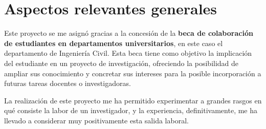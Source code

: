\section{Aspectos relevantes generales}

Este proyecto se me asignó gracias a la concesión de la \textbf{beca de colaboración de estudiantes en departamentos universitarios}, en este caso el departamento de Ingeniería Civil. Esta beca tiene como objetivo la implicación del estudiante en un proyecto de investigación, ofreciendo la posibilidad de ampliar sus conocimiento y concretar sus intereses para la posible incorporación a futuras tareas docentes o investigadoras. 

La realización de este proyecto me ha permitido experimentar a grandes rasgos en qué consiste la labor de un investigador, y la experiencia, definitivamente, me ha llevado a considerar muy positivamente esta salida laboral. 


